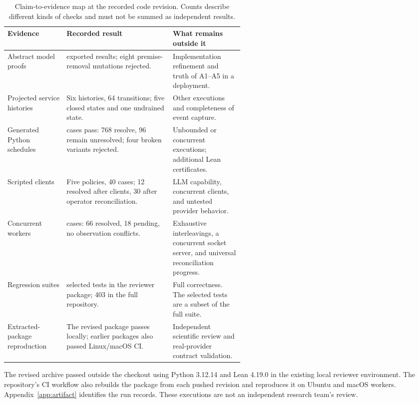 \documentclass[11pt]{article}
\begin{document}
\begin{table}[ht]
\centering\small
\begin{tabularx}{\linewidth}{@{}>{\raggedright\arraybackslash}p{0.25\linewidth} >{\raggedright\arraybackslash}X >{\raggedright\arraybackslash}p{0.30\linewidth}@{}}
\toprule
Evidence & Recorded result & What remains outside it \\
\midrule
Abstract model proofs & 14 exported results; eight premise-removal mutations rejected. & Implementation refinement and truth of A1--A5 in a deployment. \\
Projected service histories & Six histories, 64 transitions; five closed states and one undrained state. & Other executions and completeness of event capture. \\
Generated Python schedules & 864 cases pass: 768 resolve, 96 remain unresolved; four broken variants rejected. & Unbounded or concurrent executions; additional Lean certificates. \\
Scripted clients & Five policies, 40 cases; 12 resolved after clients, 30 after operator reconciliation. & LLM capability, concurrent clients, and untested provider behavior. \\
Concurrent workers & 84 cases: 66 resolved, 18 pending, no observation conflicts. & Exhaustive interleavings, a concurrent socket server, and universal reconciliation progress. \\
Regression suites & 170 selected tests in the reviewer package; 403 in the full repository. & Full correctness. The selected tests are a subset of the full suite. \\
Extracted-package reproduction & The revised package passes locally; earlier packages also passed Linux/macOS CI. & Independent scientific review and real-provider contract validation. \\
\bottomrule
\end{tabularx}
\caption{Claim-to-evidence map at the recorded code revision. Counts describe
different kinds of checks and must not be summed as independent results.}
\label{tab:evidence}
\end{table}

The revised archive passed outside the checkout using Python 3.12.14 and
Lean 4.19.0 in the existing local reviewer environment. The repository's CI
workflow also rebuilds the package from each pushed revision and reproduces it
on Ubuntu and macOS workers. Appendix~\ref{app:artifact}
identifies the run records. These executions are not an independent research
team's review.
\end{document}
